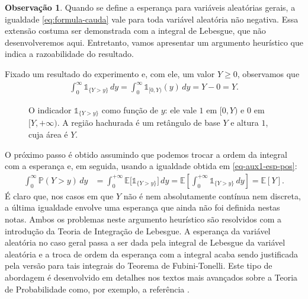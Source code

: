 \documentclass[12pt,portuguese]{article}
\theoremstyle{definition}
\newtheorem{remark}[remark]{Observação}
\theoremstyle{plainexercise}
\theoremstyle{starredexercise}
\theoremstyle{definition}
\begin{document}
\bigskip

\begin{remark}\label{rem:formula-cauda-geral}
  Quando se define a esperança para variáveis aleatórias gerais,
  a igualdade \eqref{eq:formula-cauda} vale para toda variável aleatória
  não negativa. Essa extensão costuma ser demonstrada com a integral
  de Lebesgue, que não desenvolveremos aqui.
  Entretanto, vamos apresentar um argumento heurístico que indica
  a razoabilidade do resultado. 
  
  Fixado um resultado do experimento e, com ele, um valor $Y\geqslant0$,
  observamos que
  \begin{align}\label{eq-aux1-esp-pos}
  \int_{0}^{\infty} \mathds{1}_{\{Y>y\}}\, dy
  =
  \int_{0}^{\infty} \mathds{1}_{[0,Y)}(y)\, dy = Y-0=Y.
  \end{align}
  \begin{figure}[H]
  \centering
  \caption{O indicador $\mathds{1}_{\{Y>y\}}$ como função de $y$: ele vale $1$
  em $[0,Y)$ e $0$ em $[Y,+\infty)$. A região hachurada é um retângulo de base
  $Y$ e altura $1$, cuja área é $Y$.}
  \label{fig:indicador-formula-cauda}
  \end{figure}
  O próximo passo é obtido assumindo que podemos trocar a ordem da
  integral com a esperança e, em seguida, usando a igualdade obtida em
  \eqref{eq-aux1-esp-pos}:
  \begin{align*}
  \int_{0}^{\infty} \mathbb{P}(Y>y)\, dy
  &=
  \int_{0}^{+\infty} \mathbb{E}\bigl[\mathds{1}_{\{Y>y\}}\bigr] \, dy
  =
  \mathbb{E}\left[ \int_{0}^{+\infty} \mathds{1}_{\{Y>y\}} \, dy \right] 
  =
  \mathbb{E}[Y].
  \end{align*}
É claro que, nos casos em que $Y$ não é nem absolutamente contínua nem
discreta, a última igualdade envolve uma esperança que ainda não foi
definida nestas notas. Ambos os problemas neste argumento heurístico
são resolvidos com a introdução da Teoria de Integração de Lebesgue. A esperança da variável aleatória
no caso geral passa a ser dada pela integral de Lebesgue da variável aleatória e a troca de ordem
da esperança com a integral acaba sendo justificada pela versão para tais integrais do Teorema
de Fubini-Tonelli. Este tipo de abordagem é desenvolvido em detalhes nos textos mais avançados
sobre a Teoria de Probabilidade como, por exemplo, a referência \cite{MR2893652}.
\end{remark}
\end{document}
